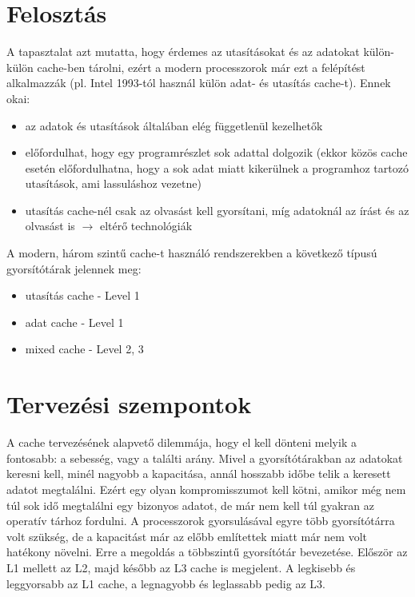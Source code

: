 \section{Felosztás}
A tapasztalat azt mutatta, hogy érdemes az utasításokat és az adatokat külön-külön cache-ben tárolni, ezért a modern processzorok már ezt a felépítést alkalmazzák (pl. Intel 1993-tól használ külön adat- és utasítás cache-t).
Ennek okai:
\begin{itemize}
    \item az adatok és utasítások általában elég függetlenül kezelhetők
    \item előfordulhat, hogy egy programrészlet sok adattal dolgozik (ekkor közös cache esetén előfordulhatna, hogy a sok adat miatt kikerülnek a programhoz tartozó utasítások, ami lassuláshoz vezetne)
    \item utasítás cache-nél csak az olvasást kell gyorsítani, míg adatoknál az írást és az olvasást is $\rightarrow$ eltérő technológiák
\end{itemize}
A modern, három szintű cache-t használó rendszerekben a következő típusú gyorsítótárak jelennek meg:
\begin{itemize}
    \item utasítás cache - Level 1
    \item adat cache - Level 1
    \item mixed cache - Level 2, 3
\end{itemize}

\section{Tervezési szempontok}
A cache tervezésének alapvető dilemmája, hogy el kell dönteni melyik a fontosabb: a sebesség, vagy a találti arány.
Mivel a gyorsítótárakban az adatokat keresni kell, minél nagyobb a kapacitása, annál hosszabb időbe telik a keresett adatot megtalálni.
Ezért egy olyan kompromisszumot kell kötni, amikor még nem túl sok idő megtalálni egy bizonyos adatot, de már nem kell túl gyakran az operatív tárhoz fordulni.
A processzorok gyorsulásával egyre több gyorsítótárra volt szükség, de a kapacitást már az előbb említettek miatt már nem volt hatékony növelni.
Erre a megoldás a többszintű gyorsítótár bevezetése.
Először az L1 mellett az L2, majd később az L3 cache is megjelent.
A legkisebb és leggyorsabb az L1 cache, a legnagyobb és leglassabb pedig az L3.

